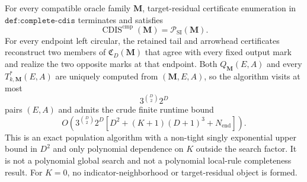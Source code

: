 For every compatible oracle family \(\mathbf M\), target-residual certificate enumeration in \(\texttt{def:complete-cdis}\) terminates and satisfies
\[
\operatorname{CDIS}^{\mathrm{cmp}}(\mathbf M)=\mathcal P_{\mathrm{SI}}(\mathbf M).
\]
For every endpoint left circular, the retained tail and arrowhead certificates reconstruct two members of \(\mathfrak C_D(\mathbf M)\) that agree with every fixed output mark and realize the two opposite marks at that endpoint.  Both \(Q_{\mathbf M}(E,A)\) and every \(T^*_{k,\mathbf M}(E,A)\) are uniquely computed from \((\mathbf M,E,A)\), so the algorithm visits at most
\[
3^{\binom D2}2^D
\]
pairs \((E,A)\) and admits the crude finite runtime bound
\[
O\!\left(3^{\binom D2}2^D
\left[D^2+(K+1)(D+1)^3+N_{\mathrm{end}}\right]\right).
\]
This is an exact population algorithm with a non-tight singly exponential upper bound in \(D^2\) and only polynomial dependence on \(K\) outside the search factor.  It is not a polynomial global search and not a polynomial local-rule completeness result.  For \(K=0\), no indicator-neighborhood or target-residual object is formed.